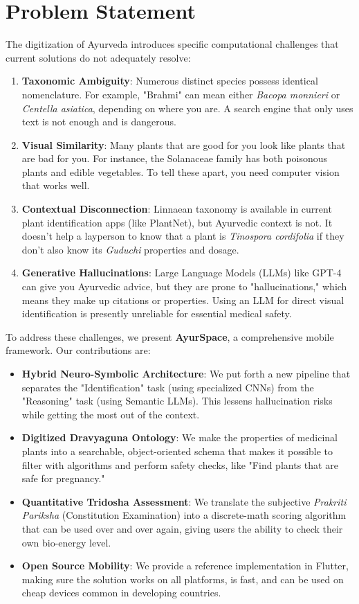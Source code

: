 \documentclass[12pt, a4paper]{report}
\begin{document}
\newpage

\section{Problem Statement} 
The digitization of Ayurveda introduces specific computational challenges that current solutions do not adequately resolve:
\begin{enumerate}[label={\textbf{\arabic*.}}, leftmargin=*]
    \item \textbf{Taxonomic Ambiguity}: Numerous distinct species possess identical nomenclature. For example, "Brahmi" can mean either \textit{Bacopa monnieri} or \textit{Centella asiatica}, depending on where you are. A search engine that only uses text is not enough and is dangerous.
    \item \textbf{Visual Similarity}: Many plants that are good for you look like plants that are bad for you. For instance, the Solanaceae family has both poisonous plants and edible vegetables. To tell these apart, you need computer vision that works well.
    \item \textbf{Contextual Disconnection}: Linnaean taxonomy is available in current plant identification apps (like PlantNet), but Ayurvedic context is not. It doesn't help a layperson to know that a plant is \textit{Tinospora cordifolia} if they don't also know its \textit{Guduchi} properties and dosage.
    \item \textbf{Generative Hallucinations}: Large Language Models (LLMs) like GPT-4 can give you Ayurvedic advice, but they are prone to "hallucinations," which means they make up citations or properties. Using an LLM for direct visual identification is presently unreliable for essential medical safety.

\end{enumerate}

To address these challenges, we present \textbf{AyurSpace}, a comprehensive mobile framework. Our contributions are:
\begin{itemize}
    \item \textbf{Hybrid Neuro-Symbolic Architecture}: We put forth a new pipeline that separates the "Identification" task (using specialized CNNs) from the "Reasoning" task (using Semantic LLMs). This lessens hallucination risks while getting the most out of the context.
    \item \textbf{Digitized Dravyaguna Ontology}: We make the properties of medicinal plants into a searchable, object-oriented schema that makes it possible to filter with algorithms and perform safety checks, like "Find plants that are safe for pregnancy."
    \item \textbf{Quantitative Tridosha Assessment}: We translate the subjective \textit{Prakriti Pariksha} (Constitution Examination) into a discrete-math scoring algorithm that can be used over and over again, giving users the ability to check their own bio-energy level.
    \item \textbf{Open Source Mobility}: We provide a reference implementation in Flutter, making sure the solution works on all platforms, is fast, and can be used on cheap devices common in developing countries.
\end{itemize}
\end{document}
